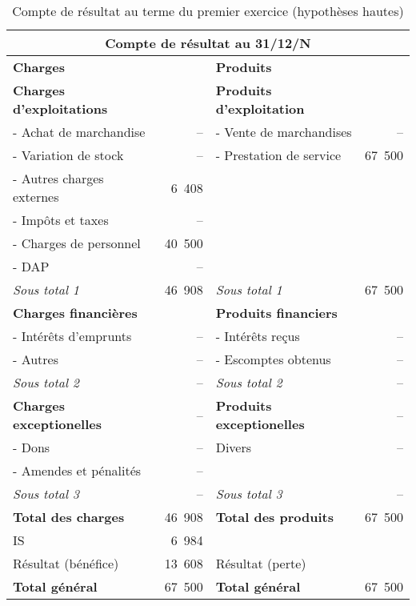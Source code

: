 		\begin{table}[h]
		  \centering
		  \begin{tabular}{|l|r|l|r|}
			\hline
			\multicolumn{4}{|c|}{\bf Compte de r\'esultat au 31/12/N}\\
			\hline
			{\bf Charges} & & {\bf Produits} & \\
			\hline
			{\bf Charges d'exploitations} & & {\bf Produits d'exploitation} & \\
			- Achat de marchandise & -- & - Vente de marchandises & --\\
			- Variation de stock & -- & - Prestation de service & 67~500\\
			- Autres charges externes & 6~408 & & \\
			- Impôts et taxes & -- & & \\
			- Charges de personnel & 40~500 & & \\
			- DAP & -- & & \\
			\cline{2-2}\cline{4-4}
			{\it Sous total 1} & 46~908 & {\it Sous total 1} & 67~500\\
			\cline{2-2}\cline{4-4}
			{\bf Charges financi\`eres} & & {\bf Produits financiers} & \\
			- Int\'er\^ets d'emprunts & -- & - Int\'er\^ets re\c cus & --\\
			- Autres & -- & - Escomptes obtenus & -- \\
			\cline{2-2}\cline{4-4}
			{\it Sous total 2} & -- & {\it Sous total 2} & -- \\
			\cline{2-2}\cline{4-4}
			{\bf Charges exceptionelles} & -- & {\bf Produits exceptionelles} & --\\
			- Dons & -- & Divers & --\\
			- Amendes et p\'enalit\'es & -- & & \\
			\cline{2-2}\cline{4-4}
			{\it Sous total 3} & -- & {\it Sous total 3} & -- \\
			\cline{2-2}\cline{4-4}
			{\bf Total des charges} & 46~908 & {\bf Total des produits} & 67~500 \\
			\cline{2-2}\cline{4-4}
			IS & 6~984 & & \\
			R\'esultat (b\'en\'efice) & 13~608 & R\'esultat (perte) & \\
			\cline{2-2}\cline{4-4}
			{\bf Total g\'en\'eral} & 67~500 & {\bf Total g\'en\'eral} & 67~500\\
			\hline
		  \end{tabular}
		  \caption{Compte de r\'esultat au terme du premier exercice (hypoth\`eses hautes)}
		  \label{tab:hypHN}
		\end{table}
		
